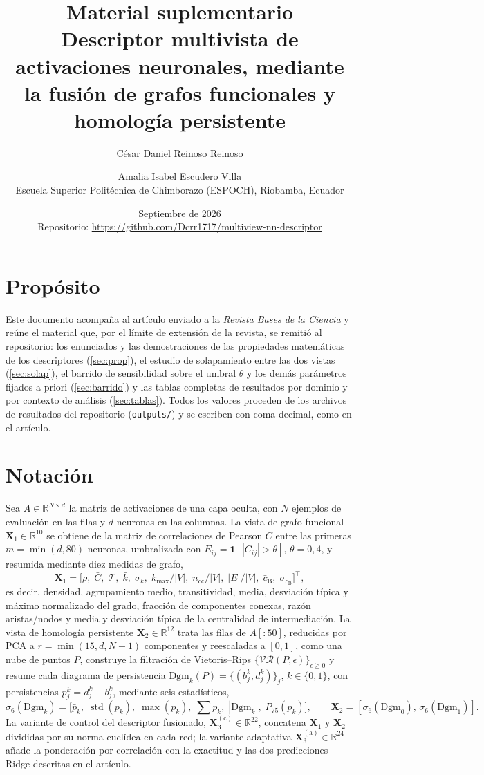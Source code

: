 \documentclass[11pt,a4paper]{article}
\title{Material suplementario\\[4pt]\large Descriptor multivista de activaciones neuronales, mediante la fusión de grafos funcionales y homología persistente}
\author{César Daniel Reinoso Reinoso \and Amalia Isabel Escudero Villa\\[2pt]\normalsize Escuela Superior Politécnica de Chimborazo (ESPOCH), Riobamba, Ecuador}
\date{Septiembre de 2026 \\[2pt] \small Repositorio: \url{https://github.com/Dcrr1717/multiview-nn-descriptor}}
\theoremstyle{plain}
\theoremstyle{remark}
\newcommand{\X}[1]{\mathbf{X}_{#1}}
\newcommand{\Xth}{\mathbf{X}_3}
\newcommand{\Dgm}[1]{\mathrm{Dgm}_{#1}}
\newcommand{\R}{\mathbb{R}}
\begin{document}
\maketitle

\section*{Propósito}
Este documento acompaña al artículo enviado a la \emph{Revista Bases de la Ciencia} y reúne el material que, por el límite de extensión de la revista, se remitió al repositorio: los enunciados y las demostraciones de las propiedades matemáticas de los descriptores (\cref{sec:prop}), el estudio de solapamiento entre las dos vistas (\cref{sec:solap}), el barrido de sensibilidad sobre el umbral $\theta$ y los demás parámetros fijados a priori (\cref{sec:barrido}) y las tablas completas de resultados por dominio y por contexto de análisis (\cref{sec:tablas}). Todos los valores proceden de los archivos de resultados del repositorio (\texttt{outputs/}) y se escriben con coma decimal, como en el artículo.

\section{Notación}
Sea $A \in \R^{N\times d}$ la matriz de activaciones de una capa oculta, con $N$ ejemplos de evaluación en las filas y $d$ neuronas en las columnas. La vista de grafo funcional $\X{1}\in\R^{10}$ se obtiene de la matriz de correlaciones de Pearson $C$ entre las primeras $m=\min(d,80)$ neuronas, umbralizada con $E_{ij}=\mathbf{1}[|C_{ij}|>\theta]$, $\theta=0{,}4$, y resumida mediante diez medidas de grafo,
\begin{equation}
  \X{1} = \bigl[\rho,\;\bar{C},\;\mathcal{T},\;\bar{k},\;\sigma_k,\;k_{\max}/|V|,\;n_{\mathrm{cc}}/|V|,\;|E|/|V|,\;\bar{c}_{\mathrm{B}},\;\sigma_{c_{\mathrm{B}}}\bigr]^\top,
  \label{eq:x1}
\end{equation}
es decir, densidad, agrupamiento medio, transitividad, media, desviación típica y máximo normalizado del grado, fracción de componentes conexas, razón aristas/nodos y media y desviación típica de la centralidad de intermediación. La vista de homología persistente $\X{2}\in\R^{12}$ trata las filas de $A[:50]$, reducidas por PCA a $r=\min(15,d,N-1)$ componentes y reescaladas a $[0,1]$, como una nube de puntos $P$, construye la filtración de Vietoris--Rips $\{\mathcal{VR}(P,\epsilon)\}_{\epsilon\ge 0}$ y resume cada diagrama de persistencia $\Dgm{k}(P)=\{(b_j^k,d_j^k)\}_j$, $k\in\{0,1\}$, con persistencias $p_j^k=d_j^k-b_j^k$, mediante seis estadísticos,
\begin{equation}
  \sigma_6(\Dgm{k}) = \bigl[\bar{p}_k,\;\operatorname{std}(p_k),\;\max(p_k),\;{\textstyle\sum} p_k,\;|\Dgm{k}|,\;P_{75}(p_k)\bigr],
  \qquad \X{2}=[\sigma_6(\Dgm{0}),\,\sigma_6(\Dgm{1})].
  \label{eq:x2block}
\end{equation}
La variante de control del descriptor fusionado, $\Xth^{(\mathrm{c})}\in\R^{22}$, concatena $\X{1}$ y $\X{2}$ divididas por su norma euclídea en cada red; la variante adaptativa $\Xth^{(\mathrm{a})}\in\R^{24}$ añade la ponderación por correlación con la exactitud y las dos predicciones Ridge descritas en el artículo.
\end{document}
